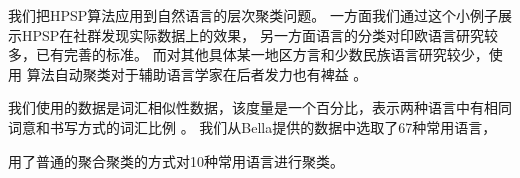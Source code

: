 \documentclass{ctexart}
\begin{document}
我们把HPSP算法应用到自然语言的层次聚类问题。
一方面我们通过这个小例子展示HPSP在社群发现实际数据上的效果，
另一方面语言的分类对印欧语言研究较多，已有完善的标准。 
而对其他具体某一地区方言和少数民族语言研究较少，使用
算法自动聚类对于辅助语言学家在后者发力也有裨益 \cite{nasution2019visualizing}。

我们使用的数据是词汇相似性数据，该度量是一个百分比，表示两种语言中有相同词意和书写方式的词汇比例
\cite{bella2021database}。
我们从Bella提供的数据中选取了67种常用语言，       


\cite{al2017characterization} 用了普通的聚合聚类的方式对10种常用语言进行聚类。




\end{document}
